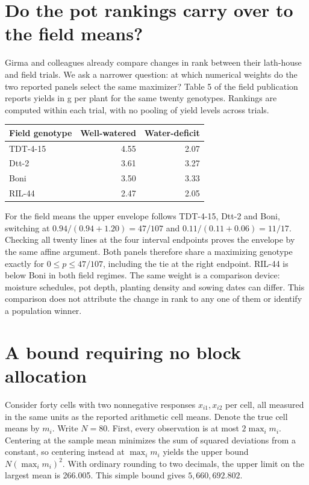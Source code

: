 \documentclass[11pt]{article}
\begin{document}
\section{Do the pot rankings carry over to the field means?}
Girma and colleagues already compare changes in rank between their lath-house and field trials. We ask a narrower question: at which numerical weights do the two reported panels select the same maximizer? Table 5 of the field publication~\cite{field} reports yields in g per plant for the same twenty genotypes. Rankings are computed within each trial, with no pooling of yield levels across trials.
\begin{center}
\begin{tabular}{lrr}
\toprule
Field genotype & Well-watered & Water-deficit\\
\midrule
TDT-4-15 & 4.55 & 2.07\\
Dtt-2 & 3.61 & 3.27\\
Boni & 3.50 & 3.33\\
RIL-44 & 2.47 & 2.05\\
\bottomrule
\end{tabular}
\end{center}
For the field means the upper envelope follows TDT-4-15, Dtt-2 and Boni, switching at $0.94/(0.94+1.20)=47/107$ and $0.11/(0.11+0.06)=11/17$. Checking all twenty lines at the four interval endpoints proves the envelope by the same affine argument. Both panels therefore share a maximizing genotype exactly for $0\le p\le47/107$, including the tie at the right endpoint. RIL-44 is below Boni in both field regimes. The same weight is a comparison device: moisture schedules, pot depth, planting density and sowing dates can differ. This comparison does not attribute the change in rank to any one of them or identify a population winner.

\section{A bound requiring no block allocation}
Consider forty cells with two nonnegative responses $x_{i1},x_{i2}$ per cell, all measured in the same units as the reported arithmetic cell means. Denote the true cell means by $m_i$. Write $N=80$. First, every observation is at most $2\max_i m_i$. Centering at the sample mean minimizes the sum of squared deviations from a constant, so centering instead at $\max_i m_i$ yields the upper bound $N(\max_i m_i)^2$. With ordinary rounding to two decimals, the upper limit on the largest mean is 266.005. This simple bound gives $5{,}660{,}692.802$.
\end{document}
